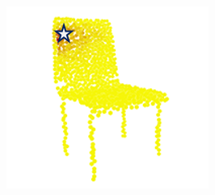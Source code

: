 \documentclass[letterpaper]{article} %
\begin{document}
\begin{figure}[htbp]
\begin{center}
\begin{minipage}[b]{0.8\linewidth}
\begin{center}
\begin{minipage}[b]{0.12\linewidth}
\begin{center}
\end{center}
\end{minipage}
\begin{minipage}[b]{0.12\linewidth}
\begin{center}
\includegraphics[width=1.0\linewidth]{images/atten_pic/dgcnn_chair_feature_3.png}
\end{center}
\end{minipage}
\end{center}
\end{minipage}
\begin{minipage}[b]{0.04\linewidth}
\begin{center}

\end{center}
\end{minipage}
\end{center}
\end{figure}
\end{document}
